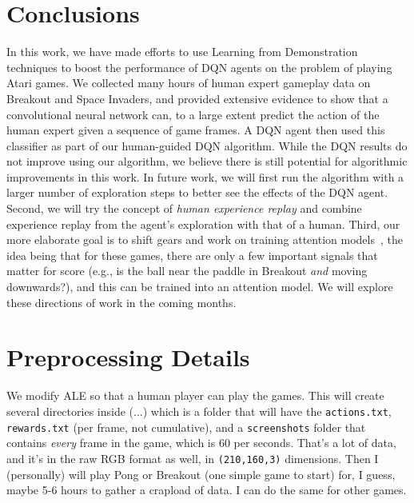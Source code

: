 \documentclass[letterpaper, 10pt, conference]{ieeeconf}
\begin{document}
\section{Conclusions}\label{sec:conclusions}

In this work, we have made efforts to use Learning from Demonstration techniques
to boost the performance of DQN agents on the problem of playing Atari games. We
collected many hours of human expert gameplay data on Breakout and Space
Invaders, and provided extensive evidence to show that a convolutional
neural network can, to a large extent predict the action of the human expert
given a sequence of game frames. A DQN agent then used this classifier as part
of our human-guided DQN algorithm. While the DQN results do not improve using
our algorithm, we believe there is still potential for algorithmic improvements
in this work. In future work, we will first run the algorithm with a larger
number of exploration steps to better see the effects of the DQN agent. Second,
we will try the concept of \emph{human experience replay} and combine experience
replay from the agent's exploration with that of a human. Third, our more
elaborate goal is to shift gears and work on training attention
models~\cite{NIPS2014_5542,icml2015_xuc15}, the idea being that for these games,
there are only a few important signals that matter for score (e.g., is the ball
near the paddle in Breakout \emph{and} moving downwards?), and this can be
trained into an attention model. We will explore these directions of work in the
coming months.






\appendices

\section{Preprocessing Details}\label{app:preprocessing_details}

We modify ALE so that a human player can play the games. This will
    create several directories inside (...)
    which is a folder that will have the \texttt{actions.txt},
    \texttt{rewards.txt} (per frame, not cumulative), and a \texttt{screenshots}
    folder that contains \emph{every} frame in the game, which is 60 per
    seconds. That's a lot of data, and it's in the raw RGB format as well, in
    \texttt{(210,160,3)} dimensions.  Then I (personally) will play Pong or
    Breakout (one simple game to start) for, I guess, maybe 5-6 hours to gather
    a crapload of data. I can do the same for other games.
\end{document}
